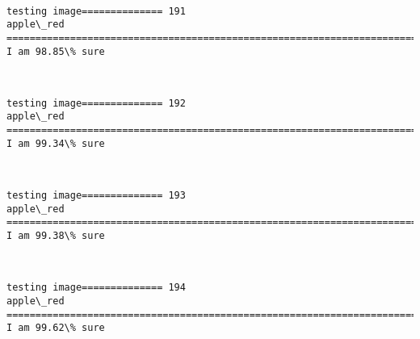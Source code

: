\documentclass[11pt]{article}
\begin{document}
    \begin{center}
    \end{center}
    { \hspace*{\fill} \\}
    
    \begin{Verbatim}[commandchars=\\\{\}]
testing image============== 191
apple\_red
============================================================================
I am 98.85\% sure

    \end{Verbatim}

    \begin{center}
    \end{center}
    { \hspace*{\fill} \\}
    
    \begin{Verbatim}[commandchars=\\\{\}]
testing image============== 192
apple\_red
============================================================================
I am 99.34\% sure

    \end{Verbatim}

    \begin{center}
    \end{center}
    { \hspace*{\fill} \\}
    
    \begin{Verbatim}[commandchars=\\\{\}]
testing image============== 193
apple\_red
============================================================================
I am 99.38\% sure

    \end{Verbatim}

    \begin{center}
    \end{center}
    { \hspace*{\fill} \\}
    
    \begin{Verbatim}[commandchars=\\\{\}]
testing image============== 194
apple\_red
============================================================================
I am 99.62\% sure

    \end{Verbatim}
\end{document}
